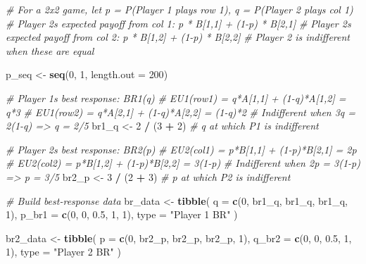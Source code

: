 \documentclass[
]{article}
\newenvironment{Shaded}{\begin{snugshade}}{\end{snugshade}}
\newcommand{\AttributeTok}[1]{\textcolor[rgb]{0.13,0.29,0.53}{#1}}
\newcommand{\CommentTok}[1]{\textcolor[rgb]{0.56,0.35,0.01}{\textit{#1}}}
\newcommand{\DecValTok}[1]{\textcolor[rgb]{0.00,0.00,0.81}{#1}}
\newcommand{\FloatTok}[1]{\textcolor[rgb]{0.00,0.00,0.81}{#1}}
\newcommand{\FunctionTok}[1]{\textcolor[rgb]{0.13,0.29,0.53}{\textbf{#1}}}
\newcommand{\NormalTok}[1]{#1}
\newcommand{\OtherTok}[1]{\textcolor[rgb]{0.56,0.35,0.01}{#1}}
\newcommand{\SpecialCharTok}[1]{\textcolor[rgb]{0.81,0.36,0.00}{\textbf{#1}}}
\newcommand{\StringTok}[1]{\textcolor[rgb]{0.31,0.60,0.02}{#1}}
\begin{document}
\begin{Shaded}
\begin{Highlighting}[]
\CommentTok{\# For a 2x2 game, let p = P(Player 1 plays row 1), q = P(Player 2 plays col 1)}
\CommentTok{\# Player 2\textquotesingle{}s expected payoff from col 1: p * B[1,1] + (1{-}p) * B[2,1]}
\CommentTok{\# Player 2\textquotesingle{}s expected payoff from col 2: p * B[1,2] + (1{-}p) * B[2,2]}
\CommentTok{\# Player 2 is indifferent when these are equal}

\NormalTok{p\_seq }\OtherTok{\textless{}{-}} \FunctionTok{seq}\NormalTok{(}\DecValTok{0}\NormalTok{, }\DecValTok{1}\NormalTok{, }\AttributeTok{length.out =} \DecValTok{200}\NormalTok{)}

\CommentTok{\# Player 1\textquotesingle{}s best response: BR1(q)}
\CommentTok{\# EU1(row1) = q*A[1,1] + (1{-}q)*A[1,2] = q*3}
\CommentTok{\# EU1(row2) = q*A[2,1] + (1{-}q)*A[2,2] = (1{-}q)*2}
\CommentTok{\# Indifferent when 3q = 2(1{-}q) =\textgreater{} q = 2/5}
\NormalTok{br1\_q }\OtherTok{\textless{}{-}} \DecValTok{2} \SpecialCharTok{/}\NormalTok{ (}\DecValTok{3} \SpecialCharTok{+} \DecValTok{2}\NormalTok{)  }\CommentTok{\# q at which P1 is indifferent}

\CommentTok{\# Player 2\textquotesingle{}s best response: BR2(p)}
\CommentTok{\# EU2(col1) = p*B[1,1] + (1{-}p)*B[2,1] = 2p}
\CommentTok{\# EU2(col2) = p*B[1,2] + (1{-}p)*B[2,2] = 3(1{-}p)}
\CommentTok{\# Indifferent when 2p = 3(1{-}p) =\textgreater{} p = 3/5}
\NormalTok{br2\_p }\OtherTok{\textless{}{-}} \DecValTok{3} \SpecialCharTok{/}\NormalTok{ (}\DecValTok{2} \SpecialCharTok{+} \DecValTok{3}\NormalTok{)  }\CommentTok{\# p at which P2 is indifferent}

\CommentTok{\# Build best{-}response data}
\NormalTok{br\_data }\OtherTok{\textless{}{-}} \FunctionTok{tibble}\NormalTok{(}
  \AttributeTok{q =} \FunctionTok{c}\NormalTok{(}\DecValTok{0}\NormalTok{, br1\_q, br1\_q, br1\_q, }\DecValTok{1}\NormalTok{),}
  \AttributeTok{p\_br1 =} \FunctionTok{c}\NormalTok{(}\DecValTok{0}\NormalTok{, }\DecValTok{0}\NormalTok{, }\FloatTok{0.5}\NormalTok{, }\DecValTok{1}\NormalTok{, }\DecValTok{1}\NormalTok{),}
  \AttributeTok{type =} \StringTok{"Player 1 BR"}
\NormalTok{)}

\NormalTok{br2\_data }\OtherTok{\textless{}{-}} \FunctionTok{tibble}\NormalTok{(}
  \AttributeTok{p =} \FunctionTok{c}\NormalTok{(}\DecValTok{0}\NormalTok{, br2\_p, br2\_p, br2\_p, }\DecValTok{1}\NormalTok{),}
  \AttributeTok{q\_br2 =} \FunctionTok{c}\NormalTok{(}\DecValTok{0}\NormalTok{, }\DecValTok{0}\NormalTok{, }\FloatTok{0.5}\NormalTok{, }\DecValTok{1}\NormalTok{, }\DecValTok{1}\NormalTok{),}
  \AttributeTok{type =} \StringTok{"Player 2 BR"}
\NormalTok{)}


\end{Highlighting}
\end{Shaded}
\end{document}

